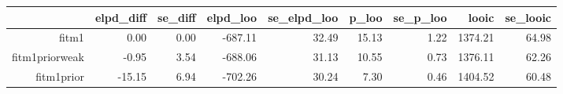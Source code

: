 \begin{table}[ht]
\centering
\begin{tabular}{rrrrrrrrr}
  \hline
 & elpd\_diff & se\_diff & elpd\_loo & se\_elpd\_loo & p\_loo & se\_p\_loo & looic & se\_looic \\ 
  \hline
fitm1 & 0.00 & 0.00 & -687.11 & 32.49 & 15.13 & 1.22 & 1374.21 & 64.98 \\ 
  fitm1priorweak & -0.95 & 3.54 & -688.06 & 31.13 & 10.55 & 0.73 & 1376.11 & 62.26 \\ 
  fitm1prior & -15.15 & 6.94 & -702.26 & 30.24 & 7.30 & 0.46 & 1404.52 & 60.48 \\ 
   \hline
\end{tabular}
\end{table}
